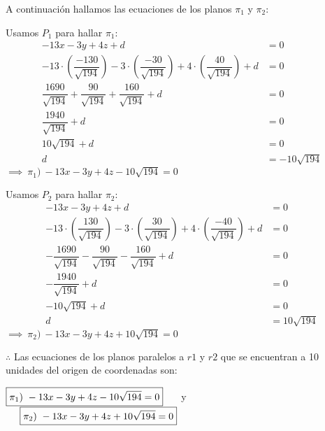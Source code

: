 \vspace{1cm}
\noindent A continuación hallamos las ecuaciones de los planos $\pi_1$ y $\pi_2$:

\noindent Usamos $P_1$ para hallar $\pi_1$:
\begin{align*}
	-13x - 3y + 4z + d                                 & = 0                     \\
	-13 \cdot \left( \dfrac{-130}{\sqrt{194}}\right)
	- 3 \cdot \left( \dfrac{-30}{\sqrt{194}}\right)
	+ 4 \cdot \left( \dfrac{40}{\sqrt{194}}\right) + d & = 0                     \\
	\dfrac{1690}{\sqrt{194}} + \dfrac{90}{\sqrt{194}}
	+ \dfrac{160}{\sqrt{194}} + d                      & = 0                     \\
	\dfrac{1940}{\sqrt{194}} + d                       & = 0                     \\
	10\sqrt{194} + d                                   & = 0                     \\
	d                                                  & = \boxed{-10\sqrt{194}}
\end{align*}
$\implies \ \pi_1) \ -13x - 3y + 4z -10\sqrt{194} = 0$

\noindent Usamos $P_2$ para hallar $\pi_2$:
\begin{align*}
	-13x - 3y + 4z + d                                  & = 0                    \\
	-13 \cdot \left( \dfrac{130}{\sqrt{194}}\right)
	- 3 \cdot \left( \dfrac{30}{\sqrt{194}}\right)
	+ 4 \cdot \left( \dfrac{-40}{\sqrt{194}}\right) + d & = 0                    \\
	- \dfrac{1690}{\sqrt{194}} - \dfrac{90}{\sqrt{194}}
	- \dfrac{160}{\sqrt{194}} + d                       & = 0                    \\
	- \dfrac{1940}{\sqrt{194}} + d                      & = 0                    \\
	- 10\sqrt{194} + d                                  & = 0                    \\
	d                                                   & = \boxed{10\sqrt{194}}
\end{align*}
$\implies \ \pi_2) \ -13x - 3y + 4z + 10\sqrt{194} = 0$

\vspace{1cm}
\noindent $\therefore$ Las ecuaciones de los planos paralelos a $r1$ y $r2$ que se encuentran a 10 unidades del origen de coordenadas son:

\begin{center}
	$\boxed{\pi_1) \ -13x - 3y + 4z -10\sqrt{194} = 0} \hspace*{0.5cm}$ y
	$\hspace*{0.5cm} \boxed{\pi_2) \ -13x - 3y + 4z + 10\sqrt{194} = 0}$
\end{center}

